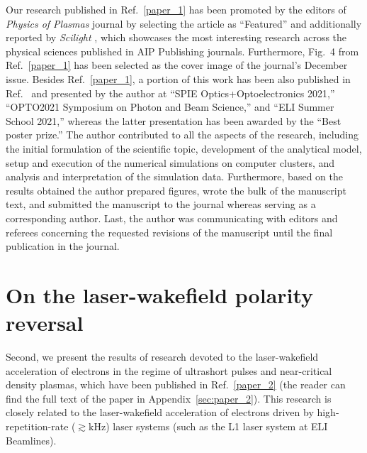 \documentclass[10pt, a4paper, twoside, openright]{report}
\newcommand{\q}[1]{``#1''} %
\begin{document}
Our research published in Ref.~\ref{paper_1} has been promoted by the editors of \textit{Physics of Plasmas} journal by selecting the article as \q{Featured} and additionally reported by \textit{Scilight} \cite{Patrick2021}, which showcases the most interesting research across the physical sciences published in AIP Publishing journals. Furthermore, Fig.~4 from Ref.~\ref{paper_1} has been selected as the cover image of the journal's December issue. Besides Ref.~\ref{paper_1}, a portion of this work has been also published in Ref.~ and presented by the author at \q{SPIE Optics+Optoelectronics 2021,} \q{OPTO2021 Symposium on Photon and Beam Science,} and \q{ELI Summer School 2021,} whereas the latter presentation has been awarded by the \q{Best poster prize.} The author contributed to all the aspects of the research, including the initial formulation of the scientific topic, development of the analytical model, setup and execution of the numerical simulations on computer clusters, and analysis and interpretation of the simulation data. Furthermore, based on the results obtained the author prepared figures, wrote the bulk of the manuscript text, and submitted the manuscript to the journal whereas serving as a corresponding author. Last, the author was communicating with editors and referees concerning the requested revisions of the manuscript until the final publication in the journal.

\section{On the laser-wakefield polarity reversal\label{sec:on_the_laser-wakefield_polarity_reversal}}
%

Second, we present the results of research devoted to the laser-wakefield acceleration of electrons in the regime of ultrashort pulses and near-critical density plasmas, which have been published in Ref.~\ref{paper_2} (the reader can find the full text of the paper in Appendix~\ref{sec:paper_2}). This research is closely related to the laser-wakefield acceleration of electrons driven by high-repetition-rate ($ \gtrsim \mathrm{kHz} $) laser systems (such as the L1 laser system at ELI Beamlines). 
\end{document}

